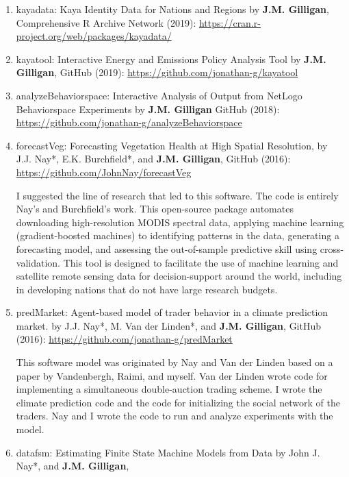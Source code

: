 %
%
\begin{enumerate}
%
\item
kayadata: Kaya Identity Data for Nations and Regions
by \textbf{J.M. Gilligan},
Comprehensive R Archive Network (2019): \url{https://cran.r-project.org/web/packages/kayadata/}
%
\item
kayatool: Interactive Energy and Emissions Policy Analysis Tool
by \textbf{J.M. Gilligan},
GitHub (2019): \url{https://github.com/jonathan-g/kayatool}
%
\item
analyzeBehaviorspace: Interactive Analysis of Output from NetLogo Behaviorspace Experiments
by \textbf{J.M. Gilligan}
GitHub (2018): \url{https://github.com/jonathan-g/analyzeBehaviorspace}
%
    \item
    forecastVeg: Forecasting Vegetation Health  at High Spatial Resolution,
	    by J.J. Nay*, E.K. Burchfield*, and \textbf{J.M. Gilligan},
	    GitHub (2016): \url{https://github.com/JohnNay/forecastVeg}
\begin{credit}
I suggested the line of research that led to this software. The code is entirely Nay's and Burchfield's work.
This open-source package automates downloading high-resolution MODIS spectral data, applying machine learning (gradient-boosted machines) to
identifying patterns in the data, generating a forecasting model, and assessing the out-of-sample predictive skill using cross-validation.
This tool is designed to facilitate the use of machine learning and satellite remote sensing data for decision-support
around the world, including in developing nations that do not have large research budgets.
\end{credit}
%
\item predMarket: Agent-based model of trader behavior in a climate prediction market.
by J.J. Nay*, M. Van der Linden*, and \textbf{J.M. Gilligan},
GitHub (2016): \url{https://github.com/jonathan-g/predMarket}
\begin{credit}
    This software model was originated by Nay and Van der Linden based on a paper by Vandenbergh, Raimi,
    and myself.
    Van der Linden wrote code for implementing a simultaneous double-auction trading scheme.
    I wrote the climate prediction code and the code for initializing the social network of the traders.
    Nay and I wrote the code to run and analyze experiments with the model.
\end{credit}
%
\item
datafsm: Estimating Finite State Machine Models from Data
by John J. Nay*, and \textbf{J.M. Gilligan},

\end{enumerate}
